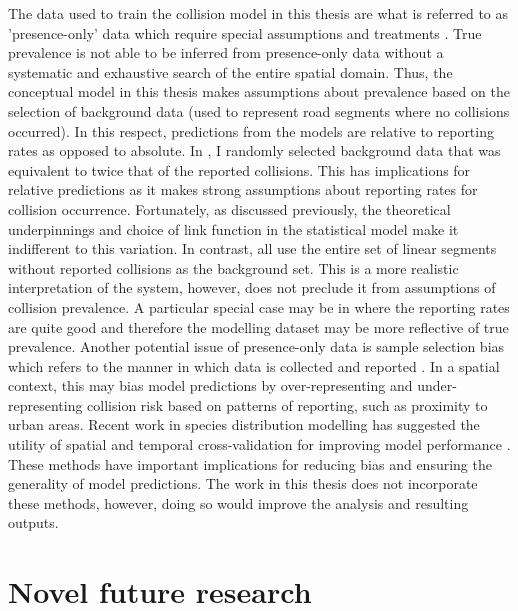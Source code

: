 The data used to train the collision model in this thesis are what is referred to as 'presence-only' data which require special assumptions and treatments \citep{hast13,wart10}. True prevalence is not able to be inferred from presence-only data without a systematic and exhaustive search of the entire spatial domain. Thus, the conceptual model in this thesis makes assumptions about prevalence based on the selection of background data (used to represent road segments where no collisions occurred). In this respect, predictions from the models are relative to reporting rates as opposed to absolute.  In , I randomly selected background data that was equivalent to twice that of the reported collisions. This has implications for relative predictions as it makes strong assumptions about reporting rates for collision occurrence. Fortunately, as discussed previously, the theoretical underpinnings and choice of link function in the statistical model make it indifferent to this variation. In contrast,  all use the entire set of linear segments without reported collisions as the background set. This is a more realistic interpretation of the system, however, does not preclude it from assumptions of collision prevalence. A particular special case may be in  where the reporting rates are quite good and therefore the modelling dataset may be more reflective of true prevalence. Another potential issue of presence-only data is sample selection bias which refers to the manner in which data is collected and reported \citep{phil08}. In a spatial context, this may bias model predictions by over-representing and under-representing collision risk based on patterns of reporting, such as proximity to urban areas. Recent work in species distribution modelling has suggested the utility of spatial and temporal cross-validation for improving model performance \citep{}. These methods have important implications for reducing bias and ensuring the generality of model predictions. The work in this thesis does not incorporate these methods, however, doing so would improve the analysis and resulting outputs.

\section{Novel future research}

